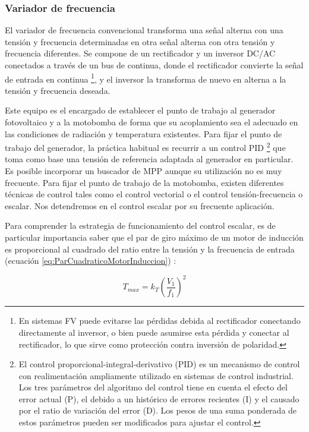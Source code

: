 \subsubsection{Variador de frecuencia}

El variador de frecuencia convencional transforma una señal alterna
con una tensión y frecuencia determinadas en otra señal alterna con
otra tensión y frecuencia diferentes. Se compone de un rectificador
y un inversor DC/AC conectados a través de un bus de continua, donde
el rectificador convierte la señal de entrada en continua%
\footnote{En sistemas FV puede evitarse las pérdidas debida al rectificador
conectando directamente al inversor, o bien puede asumirse esta pérdida
y conectar al rectificador, lo que sirve como protección contra inversión
de polaridad. %
}, y el inversor la transforma de nuevo en alterna a la tensión y frecuencia
deseada. 

Este equipo es el encargado de establecer el punto de trabajo al generador
fotovoltaico y a la motobomba de forma que su acoplamiento sea el
adecuado en las condiciones de radiación y temperatura existentes.
Para fijar el punto de trabajo del generador, la práctica habitual
es recurrir a un control PID%
\footnote{El control proporcional-integral-derivativo (PID) es un mecanismo
de control con realimentación ampliamente utilizado en sistemas de
control industrial. Los tres parámetros del algoritmo del control
tiene en cuenta el efecto del error actual (P), el debido a un histórico
de errores recientes (I) y el causado por el ratio de variación del
error (D). Los pesos de una suma ponderada de estos parámetros pueden
ser modificados para ajustar el control.%
} que toma como base una tensión de referencia adaptada al generador
en particular. Es posible incorporar un buscador de MPP aunque su
utilización no es muy frecuente. Para fijar el punto de trabajo de
la motobomba, existen diferentes técnicas de control tales como el
control vectorial o el control tensión-frecuencia o escalar. Nos detendremos
en el control escalar por su frecuente aplicación.

Para comprender la estrategia de funcionamiento del control escalar,
es de particular importancia saber que el par de giro máximo de un
motor de inducción es proporcional al cuadrado del ratio entre la
tensión y la frecuencia de entrada (ecuación \ref{eq:ParCuadraticoMotorInduccion})
\citep{FraileMora2003}:

\begin{equation}
T_{max}=k_{T}\left(\frac{V_{1}}{f_{1}}\right)^{2}\label{eq:ParCuadraticoMotorInduccion}\end{equation}


